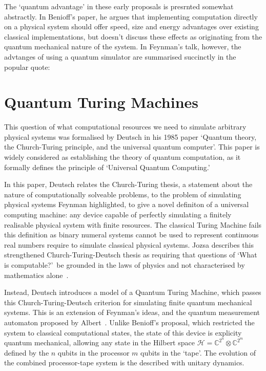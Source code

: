 \documentclass{standalone}
\begin{document}
\par
The `quantum advantage' in these early proposals is presrnted somewhat abstractly. In Benioff's paper, he argues that implementing computation directly on a physical system should offer speed, size and energy advantages over existing classical implementations, but doesn't discuss these effects as originating from the quantum mechanical nature of the system. In Feynman's talk, however, the advtanges of using a quantum simulator are summarised succinctly in the popular quote:
\par

\section{Quantum Turing Machines}\label{sec:QTM}
This question of what computational resources we need to simulate arbitrary physical systems was formalised by Deutsch in his 1985 paper `Quantum theory, the Church-Turing principle, and the universal quantum computer'. This paper is widely considered as establishing the theory of quantum computation, as it formally defines the principle of `Universal Quantum Computing.' 
\par
In this paper, Deutsch relates the Church-Turing thesis, a statement about the nature of computationally solveable problems, to the problem of simulating physical systems Feynman highlighted, to give a novel definiton of a universal computing machine: any device capable of perfectly simulating a finitely realisable physical system with finite resources. The classical Turing Machine fails this definition as binary numeral systems cannot be used to represent continuous real numbers require to simulate classical physical systems. Jozsa describes this strengthened Church-Turing-Deutsch thesis as requiring that questions of `What is computable?'\ be grounded in the laws of physics and not characterised by mathematics alone~\cite{Jozsa1997}.
\par
Instead, Deutsch introduces a model of a Quantum Turing Machine, which passes this Church-Turing-Deutsch criterion for simulating finite quantum mechanical systems. This is an extension of Feynman's ideas, and the quantum measurement automaton proposed by Albert~\cite{Albert1983}. Unlike Benioff's proposal, which restricted the system to classical computational states, the state of this device is explicity quantum mechanical, allowing any state in the Hilbert space $\mathcal{H}=\mathbb{C}^{2^{n}} \otimes \mathbb{C}^{2^{m}}$ defined by the $n$ qubits in the processor $m$ qubits in the `tape'. The evolution of the combined processor-tape system is the described with unitary dynamics. 
\end{document}
